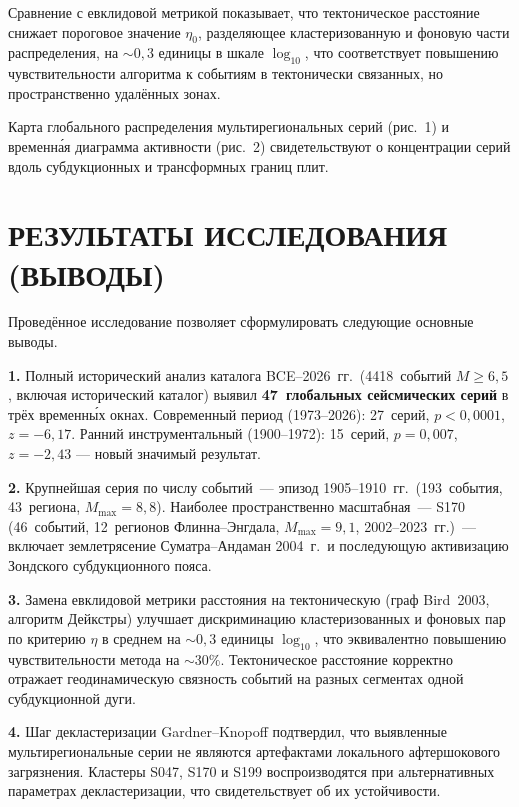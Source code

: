 \documentclass[12pt,a4paper]{article}
\begin{document}
Сравнение с евклидовой метрикой показывает, что тектоническое расстояние
снижает пороговое значение $\eta_0$, разделяющее кластеризованную и фоновую
части распределения, на $\sim0{,}3$ единицы в шкале $\log_{10}$, что
соответствует повышению чувствительности алгоритма к событиям в
тектонически связанных, но пространственно удалённых зонах.

Карта глобального распределения мультирегиональных серий (рис.~1) и
временн\'{а}я диаграмма активности (рис.~2) свидетельствуют о
концентрации серий вдоль субдукционных и трансформных границ плит.

\vspace{0.4cm}

\section*{РЕЗУЛЬТАТЫ ИССЛЕДОВАНИЯ (ВЫВОДЫ)}

Проведённое исследование позволяет сформулировать следующие основные выводы.

\textbf{1.} Полный исторический анализ каталога BCE--2026~гг.\ (4418~событий
$M\geq6{,}5$, включая исторический каталог) выявил \textbf{47~глобальных сейсмических
серий} в трёх временны́х окнах. Современный период (1973--2026): 27~серий,
$p{<}0{,}0001$, $z=-6{,}17$. Ранний инструментальный (1900--1972): 15~серий,
$p{=}0{,}007$, $z=-2{,}43$ --- новый значимый результат.

\textbf{2.} Крупнейшая серия по числу событий~--- эпизод 1905--1910~гг.\
(193~события, 43~региона, $M_{\max}=8{,}8$).
Наиболее пространственно масштабная~--- S170 (46~событий,
12~регионов Флинна--Энгдала, $M_{\max}=9{,}1$, 2002--2023~гг.)~--- включает
землетрясение Суматра--Андаман 2004~г.\ и последующую активизацию
Зондского субдукционного пояса.

\textbf{3.} Замена евклидовой метрики расстояния на тектоническую
(граф Bird~2003, алгоритм Дейкстры) улучшает дискриминацию кластеризованных
и фоновых пар по критерию $\eta$ в среднем на $\sim0{,}3$ единицы $\log_{10}$,
что эквивалентно повышению чувствительности метода на $\sim30\%$. Тектоническое
расстояние корректно отражает геодинамическую связность событий на разных
сегментах одной субдукционной дуги.

\textbf{4.} Шаг декластеризации Gardner--Knopoff подтвердил, что выявленные
мультирегиональные серии не являются артефактами локального афтершокового
загрязнения. Кластеры S047, S170 и S199 воспроизводятся при альтернативных
параметрах декластеризации, что свидетельствует об их устойчивости.
\end{document}
